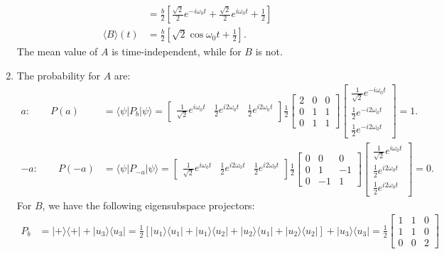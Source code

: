 \documentclass[letterpaper,11pt,twoside]{article}
\newcommand{\ket}[1]{|#1\rangle}
\newcommand{\bra}[1]{\langle#1|}
\newcommand{\braket}[1]{\langle#1\rangle}
\begin{document}
\begin{enumerate}[itemsep=0pt,topsep=0pt,label=\alph*.]
\begin{align*}
    &=\frac{b}{2}\left[\frac{\sqrt{2}}{2}e^{-i\omega_0t}+\frac{\sqrt{2}}{2}e^{i\omega_0t}+\frac{1}{2}\right]\\
    \braket{B}(t)&=\frac{b}{2}\left[\sqrt{2}\cos\omega_0t+\frac{1}{2}\right].
  \end{align*}
  The mean value of $A$ is time-independent, while for $B$ is not.
  \item The probability for $A$ are:
    \begin{align*}
    a:\qquad P(a)&=\braket{\psi|P_b|\psi}=\begin{bmatrix}
      \frac{1}{\sqrt{2}}e^{i\omega_0t}&\frac{1}{2}e^{i2\omega_0t}&\frac{1}{2}e^{i2\omega_0t}
    \end{bmatrix}\frac{1}{2}\begin{bmatrix}
      2&0&0\\0&1&1\\0&1&1
    \end{bmatrix}\begin{bmatrix}
      \frac{1}{\sqrt{2}}e^{-i\omega_0t}\\\frac{1}{2}e^{-i2\omega_0t}\\\frac{1}{2}e^{-i2\omega_0t}
    \end{bmatrix}=1.\\
    -a:\qquad P(-a)&=\braket{\psi|P_{-a}|\psi}=\begin{bmatrix}
      \frac{1}{\sqrt{2}}e^{i\omega_0t}&\frac{1}{2}e^{i2\omega_0t}&\frac{1}{2}e^{i2\omega_0t}
    \end{bmatrix}\frac{1}{2}\begin{bmatrix}
      0&0&0\\0&1&-1\\0&-1&1
    \end{bmatrix}\begin{bmatrix}
      \frac{1}{\sqrt{2}}e^{i\omega_0t}\\\frac{1}{2}e^{i2\omega_0t}\\\frac{1}{2}e^{i2\omega_0t}
    \end{bmatrix}=0.
  \end{align*}
  For $B$, we have the following eigensubspace projectors:
  \begin{align*}
    P_{b}&=\ket{+}\bra{+}+\ket{u_3}\bra{u_3}=\frac{1}{2}[\ket{u_1}\bra{u_1}+\ket{u_1}\bra{u_2}+\ket{u_2}\bra{u_1}+\ket{u_2}\bra{u_2}]+\ket{u_3}\bra{u_3}=\frac{1}{2}\begin{bmatrix}
      1&1&0\\1&1&0\\0&0&2
    \end{bmatrix}\\

\end{align*}
\end{enumerate}
\end{document}

